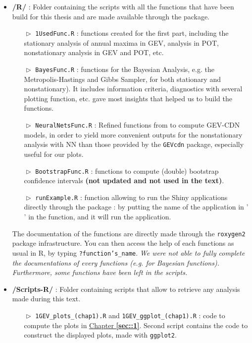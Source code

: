 \begin{itemize}
\item \textbf{/R/} : Folder containing the scripts with all the functions that have been build for this thesis and are made available through the package. 

  \begin{itemize}
\item[$\vartriangleright$] \texttt{1UsedFunc.R} : functions created for the first part, including  the stationary analysis of annual maxima in GEV, analysis in POT, nonstationary analysis in GEV and POT, etc.
\item[$\vartriangleright$] \texttt{BayesFunc.R} : functions for the Bayesian Analysis, e.g. the Metropolis-Hastings and Gibbs Sampler, for both stationary and nonstationary). It includes information criteria, diagnostics with several plotting function, etc. \citet[chap.13]{dey_extreme_2016} gave most insights that helped us to build the functions.

\item[$\vartriangleright$] \texttt{NeuralNetsFunc.R} : Refined functions from \citet{cannon_flexible_2010} to compute GEV-CDN models, in order to yield more convenient outputs for the nonstationary analysis with NN than those provided by the \texttt{GEVcdn} package, especially useful for our plots. 
\item[$\vartriangleright$] \texttt{BootstrapFunc.R} : functions to compute (double) bootstrap confidence intervals \textbf{(not updated and not used in the text)}.
\item[$\vartriangleright$] \texttt{runExample.R} : function allowing to run the Shiny applications directly through the package : by putting the name of the application in ' ' in the function, and it will run the application. 
  \end{itemize} 

The documentation of the functions are directly made through the \texttt{roxygen2} package infrastructure. You can then access the help of each functions as usual in R, by typing \texttt{?function's\_name}. 
\emph{We were not able to fully complete the documentations of every functions (e.g. for Bayesian functions). Furthermore, some functions have been left in the scripts.}
\item \textbf{/Scripts-R/} : Folder containing scripts that allow to retrieve any analysis made during this text.

  \begin{itemize}
\item[$\vartriangleright$] \texttt{1GEV\_plots\_(chap1).R} and \texttt{1GEV\_ggplot\_(chap1).R} : code to compute the plots in \hyperref[sec::1]{Chapter \textbf{\ref{sec::1}}}. Second script contains the code to construct the displayed plots, made with \texttt{ggplot2}.


\end{itemize}
\end{itemize}
